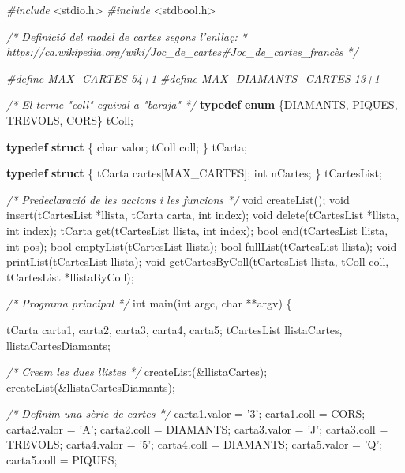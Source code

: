 \documentclass[]{book}
\newenvironment{Shaded}{\begin{snugshade}}{\end{snugshade}}
\newcommand{\KeywordTok}[1]{\textcolor[rgb]{0.13,0.29,0.53}{\textbf{#1}}}
\newcommand{\DataTypeTok}[1]{\textcolor[rgb]{0.13,0.29,0.53}{#1}}
\newcommand{\CharTok}[1]{\textcolor[rgb]{0.31,0.60,0.02}{#1}}
\newcommand{\ImportTok}[1]{#1}
\newcommand{\CommentTok}[1]{\textcolor[rgb]{0.56,0.35,0.01}{\textit{#1}}}
\newcommand{\PreprocessorTok}[1]{\textcolor[rgb]{0.56,0.35,0.01}{\textit{#1}}}
\newcommand{\NormalTok}[1]{#1}
\begin{document}
\begin{Shaded}
\begin{Highlighting}[]
\PreprocessorTok{#include }\ImportTok{<stdio.h>}
\PreprocessorTok{#include }\ImportTok{<stdbool.h>}

\CommentTok{/* Definició del model de cartes segons l'enllaç:}
\CommentTok{ *  https://ca.wikipedia.org/wiki/Joc_de_cartes#Joc_de_cartes_francès }
\CommentTok{ */}

\PreprocessorTok{#define MAX_CARTES 54+1}
\PreprocessorTok{#define MAX_DIAMANTS_CARTES 13+1}

\CommentTok{/* El terme "coll" equival a "baraja" */}
\KeywordTok{typedef} \KeywordTok{enum}\NormalTok{ \{DIAMANTS, PIQUES, TREVOLS, CORS\} tColl;}

\KeywordTok{typedef} \KeywordTok{struct}\NormalTok{ \{}
    \DataTypeTok{char}\NormalTok{ valor;}
\NormalTok{    tColl coll;}
\NormalTok{\} tCarta;}

\KeywordTok{typedef} \KeywordTok{struct}\NormalTok{ \{}
\NormalTok{    tCarta cartes[MAX_CARTES];}
    \DataTypeTok{int}\NormalTok{ nCartes;}
\NormalTok{\} tCartesList;}

\CommentTok{/* Predeclaració de les accions i les funcions */}
\DataTypeTok{void}\NormalTok{ createList();}
\DataTypeTok{void}\NormalTok{ insert(tCartesList *llista, tCarta carta, }\DataTypeTok{int}\NormalTok{ index);}
\DataTypeTok{void}\NormalTok{ delete(tCartesList *llista, }\DataTypeTok{int}\NormalTok{ index);}
\NormalTok{tCarta get(tCartesList llista, }\DataTypeTok{int}\NormalTok{ index);}
\NormalTok{bool end(tCartesList llista, }\DataTypeTok{int}\NormalTok{ pos);}
\NormalTok{bool emptyList(tCartesList llista);}
\NormalTok{bool fullList(tCartesList llista);}
\DataTypeTok{void}\NormalTok{ printList(tCartesList llista);}
\DataTypeTok{void}\NormalTok{ getCartesByColl(tCartesList llista, tColl coll, tCartesList *llistaByColl);}

\CommentTok{/* Programa principal */}
\DataTypeTok{int}\NormalTok{ main(}\DataTypeTok{int}\NormalTok{ argc, }\DataTypeTok{char}\NormalTok{ **argv) \{}

\NormalTok{    tCarta carta1, carta2, carta3, carta4, carta5;}
\NormalTok{    tCartesList llistaCartes, llistaCartesDiamants;}

    \CommentTok{/* Creem les dues llistes */}
\NormalTok{    createList(&llistaCartes);}
\NormalTok{    createList(&llistaCartesDiamants);}

    \CommentTok{/* Definim una sèrie de cartes */}
\NormalTok{    carta1.valor = }\CharTok{'3'}\NormalTok{;}
\NormalTok{    carta1.coll = CORS;}
\NormalTok{    carta2.valor = }\CharTok{'A'}\NormalTok{;}
\NormalTok{    carta2.coll = DIAMANTS;}
\NormalTok{    carta3.valor = }\CharTok{'J'}\NormalTok{;}
\NormalTok{    carta3.coll = TREVOLS;}
\NormalTok{    carta4.valor = }\CharTok{'5'}\NormalTok{;}
\NormalTok{    carta4.coll = DIAMANTS;}
\NormalTok{    carta5.valor = }\CharTok{'Q'}\NormalTok{;}
\NormalTok{    carta5.coll = PIQUES;}


\end{Highlighting}
\end{Shaded}
\end{document}
